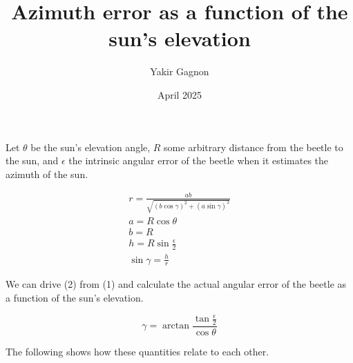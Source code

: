 \documentclass{article}
\title{Azimuth error as a function of the sun's elevation}
\author{Yakir Gagnon}
\date{April 2025}
\begin{document}
\maketitle
Let $\theta$ be the sun's elevation angle, $R$ some arbitrary distance from the beetle to the sun, and $\epsilon$ the intrinsic angular error of the beetle when it estimates the azimuth of the sun.

\begin{equation}
\begin{aligned}
r = \frac{ab}{\sqrt{(b \cos \gamma)^2 + (a\sin \gamma)^2}}\\
a = R \cos \theta\\
b = R\\
h = R \sin\frac{\epsilon}{2}\\
\sin \gamma = \frac{h}{r}
\end{aligned}
\end{equation}

We can drive (2) from (1) and calculate the actual angular error of the beetle as a function of the sun's elevation.

\begin{equation}
\gamma = \arctan \frac{\tan \frac{\epsilon}{2}}{\cos \theta}
\end{equation}

The following shows how these quantities relate to each other.
\vspace{1cm}

\end{document}
